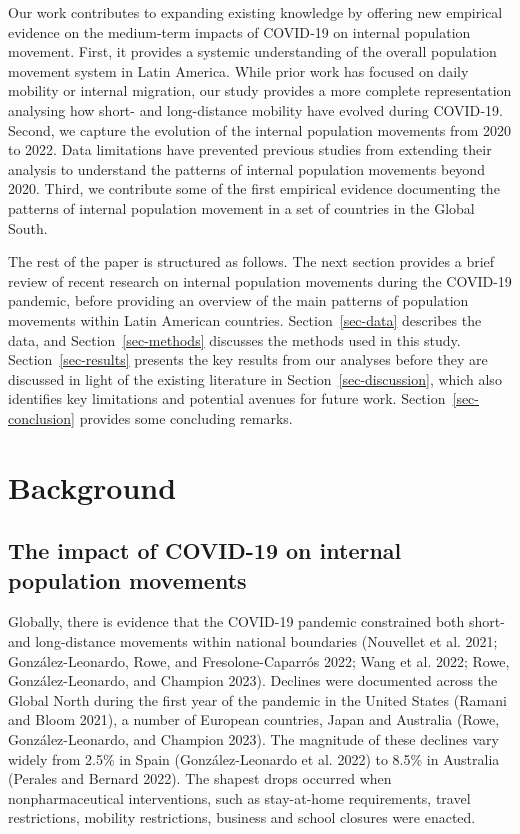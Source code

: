 \documentclass[
  11pt,
]{article}
\begin{document}
Our work contributes to expanding existing knowledge by offering new
empirical evidence on the medium-term impacts of COVID‐19 on internal
population movement. First, it provides a systemic understanding of the
overall population movement system in Latin America. While prior work
has focused on daily mobility or internal migration, our study provides
a more complete representation analysing how short- and long-distance
mobility have evolved during COVID‐19. Second, we capture the evolution
of the internal population movements from 2020 to 2022. Data limitations
have prevented previous studies from extending their analysis to
understand the patterns of internal population movements beyond 2020.
Third, we contribute some of the first empirical evidence documenting
the patterns of internal population movement in a set of countries in
the Global South.

The rest of the paper is structured as follows. The next section
provides a brief review of recent research on internal population
movements during the COVID-19 pandemic, before providing an overview of
the main patterns of population movements within Latin American
countries. Section~\ref{sec-data} describes the data, and
Section~\ref{sec-methods} discusses the methods used in this study.
Section~\ref{sec-results} presents the key results from our analyses
before they are discussed in light of the existing literature in
Section~\ref{sec-discussion}, which also identifies key limitations and
potential avenues for future work. Section~\ref{sec-conclusion} provides
some concluding remarks.

\hypertarget{sec-background}{%
\section{Background}\label{sec-background}}

\hypertarget{the-impact-of-covid-19-on-internal-population-movements}{%
\subsection{The impact of COVID-19 on internal population
movements}\label{the-impact-of-covid-19-on-internal-population-movements}}

Globally, there is evidence that the COVID-19 pandemic constrained both
short- and long-distance movements within national boundaries (Nouvellet
et al. 2021; González-Leonardo, Rowe, and Fresolone-Caparrós 2022; Wang
et al. 2022; Rowe, González-Leonardo, and Champion 2023). Declines were
documented across the Global North during the first year of the pandemic
in the United States (Ramani and Bloom 2021), a number of European
countries, Japan and Australia (Rowe, González-Leonardo, and Champion
2023). The magnitude of these declines vary widely from 2.5\% in Spain
(González-Leonardo et al. 2022) to 8.5\% in Australia (Perales and
Bernard 2022). The shapest drops occurred when nonpharmaceutical
interventions, such as stay-at-home requirements, travel restrictions,
mobility restrictions, business and school closures were enacted.
\end{document}
